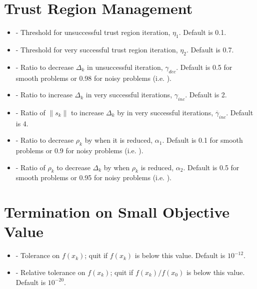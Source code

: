 \documentclass[letterpaper,10pt,english]{sphinxmanual}
\begin{document}
\section{Trust Region Management}
\label{\detokenize{advanced:trust-region-management}}\begin{itemize}
\item {} 
 - Threshold for unsuccessful trust region iteration, \(\eta_1\). Default is 0.1.

\item {} 
 - Threshold for very successful trust region iteration, \(\eta_2\). Default is 0.7.

\item {} 
 - Ratio to decrease \(\Delta_k\) in unsuccessful iteration, \(\gamma_{dec}\). Default is 0.5 for smooth problems or 0.98 for noisy problems (i.e. ).

\item {} 
 - Ratio to increase \(\Delta_k\) in very successful iterations, \(\gamma_{inc}\). Default is 2.

\item {} 
 - Ratio of \(\|s_k\|\) to increase \(\Delta_k\) by in very successful iterations, \(\overline{\gamma}_{inc}\). Default is 4.

\item {} 
 - Ratio to decrease \(\rho_k\) by when it is reduced, \(\alpha_1\). Default is 0.1 for smooth problems or 0.9 for noisy problems (i.e. ).

\item {} 
 - Ratio of \(\rho_k\) to decrease \(\Delta_k\) by when \(\rho_k\) is reduced, \(\alpha_2\). Default is 0.5 for smooth problems or 0.95 for noisy problems (i.e. ).

\end{itemize}


\section{Termination on Small Objective Value}
\label{\detokenize{advanced:termination-on-small-objective-value}}\begin{itemize}
\item {} 
 - Tolerance on \(f(x_k)\); quit if \(f(x_k)\) is below this value. Default is \(10^{-12}\).

\item {} 
 - Relative tolerance on \(f(x_k)\); quit if \(f(x_k)/f(x_0)\) is below this value. Default is \(10^{-20}\).

\end{itemize}
\end{document}
